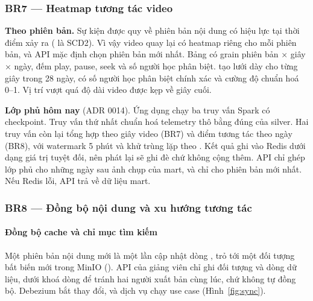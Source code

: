\subsubsection{BR7 --- Heatmap tương tác video}

\textbf{Theo phiên bản.} Sự kiện được quy về phiên bản nội dung có hiệu lực tại thời điểm xảy ra ( là SCD2). Vì vậy video quay lại có heatmap riêng cho mỗi phiên bản, và API mặc định chọn phiên bản mới nhất. Bảng  có grain phiên bản × giây × ngày, đếm play, pause, seek và số người học phân biệt.  tạo lưới dày cho từng giây trong 28 ngày, có số người học phân biệt chính xác và cường độ chuẩn hoá 0--1. Vị trí vượt quá độ dài video được kẹp về giây cuối.

\textbf{Lớp phủ hôm nay} (ADR 0014). Ứng dụng  chạy ba truy vấn Spark có checkpoint. Truy vấn thứ nhất chuẩn hoá telemetry thô bằng đúng  của silver. Hai truy vấn còn lại tổng hợp theo giây video (BR7) và điểm tương tác theo ngày (BR8), với watermark 5 phút và khử trùng lặp theo . Kết quả ghi vào Redis dưới dạng giá trị tuyệt đối, nên phát lại sẽ ghi đè chứ không cộng thêm. API chỉ ghép lớp phủ cho những ngày sau ảnh chụp của mart, và chỉ cho phiên bản mới nhất. Nếu Redis lỗi, API trả về dữ liệu mart.

\subsubsection{BR8 --- Đồng bộ nội dung và xu hướng tương tác}

\paragraph{Đồng bộ cache và chỉ mục tìm kiếm}
\label{sec:br8-sync}

Một phiên bản nội dung mới là một lần cập nhật dòng , trỏ tới một đối tượng bất biến mới trong MinIO (). API của giảng viên chỉ ghi đối tượng và dòng dữ liệu, dưới khoá dòng để tránh hai người xuất bản cùng lúc, chứ không tự đồng bộ. Debezium bắt thay đổi, và dịch vụ  chạy use case  (Hình~\ref{fig:sync}).

